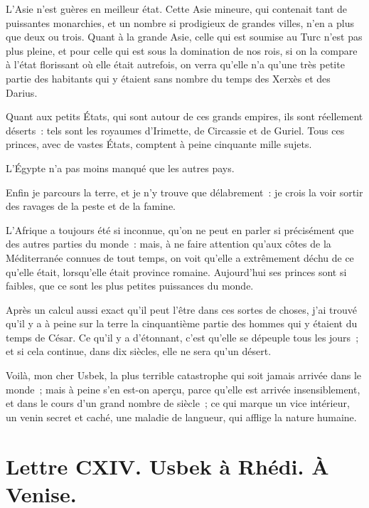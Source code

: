 \documentclass[french,twoside]{book} %
\newcommand{\dateline}[1]{\medskip{\RaggedLeft{#1}\par}\bigskip}
\begin{document}
L’Asie n’est guères en meilleur état. Cette Asie mineure, qui contenait tant de puissantes monarchies, et un nombre si prodigieux de grandes villes, n’en a plus que deux ou trois. Quant à la grande Asie, celle qui est soumise au Turc n’est pas plus pleine, et pour celle qui est sous la domination de nos rois, si on la compare à l’état florissant où elle était autrefois, on verra qu’elle n’a qu’une très petite partie des habitants qui y étaient sans nombre du temps des Xerxès et des Darius.\par
Quant aux petits États, qui sont autour de ces grands empires, ils sont réellement déserts : tels sont les royaumes d’Irimette, de Circassie et de Guriel. Tous ces princes, avec de vastes États, comptent à peine cinquante mille sujets.\par
L’Égypte n’a pas moins manqué que les autres pays.\par
Enfin je parcours la terre, et je n’y trouve que délabrement : je crois la voir sortir des ravages de la peste et de la famine.\par
L’Afrique a toujours été si inconnue, qu’on ne peut en parler si précisément que des autres parties du monde : mais, à ne faire attention qu’aux côtes de la Méditerranée connues de tout temps, on voit qu’elle a extrêmement déchu de ce qu’elle était, lorsqu’elle était province romaine. Aujourd’hui ses princes sont si faibles, que ce sont les plus petites puissances du monde.\par
Après un calcul aussi exact qu’il peut l’être dans ces sortes de choses, j’ai trouvé qu’il y a à peine sur la terre la cinquantième partie des hommes qui y étaient du temps de César. Ce qu’il y a d’étonnant, c’est qu’elle se dépeuple tous les jours ; et si cela continue, dans dix siècles, elle ne sera qu’un désert.\par
Voilà, mon cher Usbek, la plus terrible catastrophe qui soit jamais arrivée dans le monde ; mais à peine s’en est-on aperçu, parce qu’elle est arrivée insensiblement, et dans le cours d’un grand nombre de siècle ; ce qui marque un vice intérieur, un venin secret et caché, une maladie de langueur, qui afflige la nature humaine.\par

\dateline{De Venise, le 10 de la lune de Rhégeb, 1718.}
\section[{Lettre CXIV. Usbek à Rhédi. À Venise.}]{Lettre CXIV. Usbek à Rhédi. À Venise.}\renewcommand{\leftmark}{Lettre CXIV. Usbek à Rhédi. À Venise.}
\end{document}
